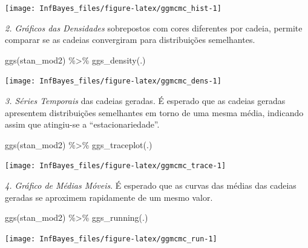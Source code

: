 \documentclass[
]{book}
\newenvironment{Shaded}{\begin{snugshade}}{\end{snugshade}}
\newcommand{\FunctionTok}[1]{\textcolor[rgb]{0.00,0.00,0.00}{#1}}
\newcommand{\NormalTok}[1]{#1}
\newcommand{\SpecialCharTok}[1]{\textcolor[rgb]{0.00,0.00,0.00}{#1}}
\begin{document}
\begin{center}\texttt{[image: InfBayes\_files/figure-latex/ggmcmc\_hist-1]} \end{center}

\emph{2. Gráficos das Densidades} sobrepostos com cores diferentes por cadeia, permite comparar se as cadeias convergiram para distribuições semelhantes.

\begin{Shaded}
\begin{Highlighting}[]
\FunctionTok{ggs}\NormalTok{(stan\_mod2) }\SpecialCharTok{\%\textgreater{}\%} \FunctionTok{ggs\_density}\NormalTok{(.)}
\end{Highlighting}
\end{Shaded}

\begin{center}\texttt{[image: InfBayes\_files/figure-latex/ggmcmc\_dens-1]} \end{center}

\emph{3. Séries Temporais} das cadeias geradas. É esperado que as cadeias geradas apresentem distribuições semelhantes em torno de uma mesma média, indicando assim que atingiu-se a ``estacionariedade''.

\begin{Shaded}
\begin{Highlighting}[]
\FunctionTok{ggs}\NormalTok{(stan\_mod2) }\SpecialCharTok{\%\textgreater{}\%} \FunctionTok{ggs\_traceplot}\NormalTok{(.)}
\end{Highlighting}
\end{Shaded}

\begin{center}\texttt{[image: InfBayes\_files/figure-latex/ggmcmc\_trace-1]} \end{center}

\emph{4. Gráfico de Médias Móveis}. É esperado que as curvas das médias das cadeias geradas se aproximem rapidamente de um mesmo valor.

\begin{Shaded}
\begin{Highlighting}[]
\FunctionTok{ggs}\NormalTok{(stan\_mod2) }\SpecialCharTok{\%\textgreater{}\%} \FunctionTok{ggs\_running}\NormalTok{(.)}
\end{Highlighting}
\end{Shaded}

\begin{center}\texttt{[image: InfBayes\_files/figure-latex/ggmcmc\_run-1]} \end{center}
\end{document}
